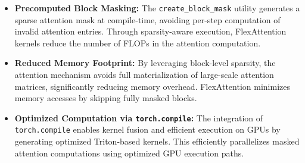 \documentclass{article} %
\begin{document}
\begin{itemize}
    \item \textbf{Precomputed Block Masking:} The \texttt{create\_block\_mask} utility generates a sparse attention mask at compile-time, avoiding per-step computation of invalid attention entries. Through sparsity-aware execution, FlexAttention kernels reduce the number of FLOPs in the attention computation.
    \item \textbf{Reduced Memory Footprint:} By leveraging block-level sparsity, the attention mechanism avoids full materialization of large-scale attention matrices, significantly reducing memory overhead. FlexAttention minimizes memory accesses by skipping fully masked blocks.
    \item \textbf{Optimized Computation via \texttt{torch.compile}:} The integration of \texttt{torch.compile} enables kernel fusion and efficient execution on GPUs by generating optimized Triton-based kernels. This efficiently parallelizes masked attention computations using optimized GPU execution paths.
\end{itemize}
\end{document}
